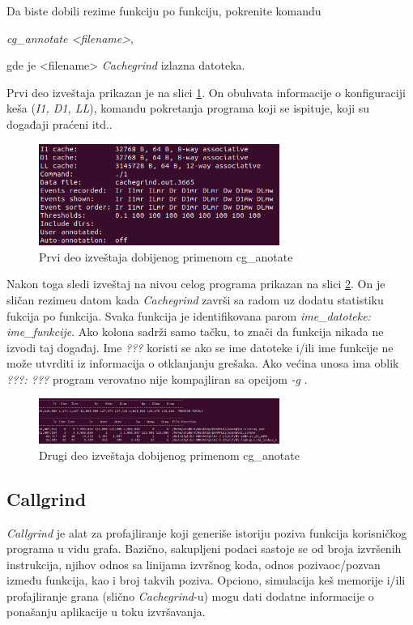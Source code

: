 \documentclass[12pt,oneside]{memoir}
\theoremstyle{plain}
\theoremstyle{definition}
\begin{document}
Da biste dobili rezime funkciju po funkciju, pokrenite komandu
\begin{center}
\textit{cg\_annotate <filename>},
\end{center}
gde je <filename> \textit{Cachegrind} izlazna datoteka.

Prvi deo izveštaja prikazan je na slici \ref{fig:slika2.16}. On obuhvata informacije o konfiguraciji keša (\textit{I1, D1, LL}), komandu pokretanja programa koji se ispituje, koji su događaji praćeni itd.. 
\begin{figure}[!ht]
  \centering
  \includegraphics[width=0.7\textwidth]{CgAnotateFirst.png}
  \caption{Prvi deo izveštaja dobijenog primenom cg\_anotate}
  \label{fig:slika2.16}
\end{figure}

Nakon toga sledi izveštaj na nivou celog programa prikazan na slici \ref{fig:slika2.17}. On je sličan rezimeu datom kada \textit{Cachegrind} završi sa radom uz dodatu statistiku fukcija po funkcija. Svaka funkcija je identifikovana parom \textit{ime\_datoteke: ime\_funkcije}. Ako kolona sadrži samo tačku, to znači da funkcija nikada ne izvodi taj događaj. Ime \textit{???} koristi se ako se ime datoteke i/ili ime funkcije ne može utvrditi iz informacija o otklanjanju grešaka. Ako većina unosa ima oblik \textit{???: ???} program verovatno nije kompajliran sa opcijom \textit{-g} \cite{Cachegrind}. 
\begin{figure}[!ht]
  \centering
  \includegraphics[width=0.7\textwidth]{CgAnotateSecond.png}
  \caption{Drugi deo izveštaja dobijenog primenom cg\_anotate}
  \label{fig:slika2.17}
\end{figure}

\subsection{Callgrind}
\textit{Callgrind} je alat za profajliranje koji generiše istoriju poziva funkcija korisničkog programa u vidu grafa. Bazično, sakupljeni podaci sastoje se od broja izvršenih instrukcija, njihov odnos sa linijama izvršnog koda, odnos pozivaoc/pozvan između funkcija, kao i broj takvih poziva. Opciono, simulacija keš memorije i/ili profajliranje grana (slično \textit{Cachegrind}-u) mogu dati dodatne informacije o ponašanju aplikacije u toku izvršavanja. 
\end{document}
